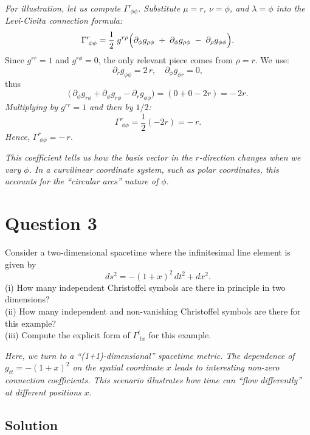     \emph{For illustration, let us compute \(\Gamma^r_{\;\phi\phi}\). Substitute \(\mu = r\), \(\nu = \phi\), and \(\lambda = \phi\) into the Levi-Civita connection formula:}
    \[
        \Gamma^r_{\;\phi\phi}
        =
        \frac{1}{2}
        \;g^{r\rho}
        \Bigl(
        \partial_\phi g_{\rho\phi}
        \;+\;
        \partial_\phi g_{\rho\phi}
        \;-\;
        \partial_\rho g_{\phi\phi}
        \Bigr).
    \]
    Since \(g^{rr} = 1\) and \(g^{r\phi} = 0\), the only relevant piece comes from \(\rho = r\). We use:
    \[
        \partial_r g_{\phi\phi} = 2\,r,
        \quad
        \partial_\phi g_{\phi r} = 0,
    \]
    thus
    \[
        \bigl(\,\partial_\phi g_{r\phi} + \partial_\phi g_{r\phi} - \partial_r g_{\phi\phi}\bigr)
        =
        (0 + 0 - 2r)
        =
        -\,2r.
    \]
    \emph{Multiplying by \(g^{rr} = 1\) and then by \(1/2\):}
    \[
        \Gamma^r_{\;\phi\phi}
        =
        \frac12 (-2r)
        =
        -\,r.
    \]
    \emph{Hence,}
    \(\boxed{\Gamma^r_{\;\phi\phi} = -\,r}.\)

    \emph{This coefficient tells us how the basis vector in the \(r\)-direction changes when we vary \(\phi\). In a curvilinear coordinate system, such as polar coordinates, this accounts for the “circular arcs” nature of \(\phi\).}

    \pagebreak

    \section*{Question 3}

    Consider a two-dimensional spacetime where the infinitesimal line element is given by
    \[
        ds^2 = -(1+x)^2 \, dt^2 + dx^2.
    \]
    (i) How many independent Christoffel symbols are there in principle in two dimensions?\\
    (ii) How many independent and non-vanishing Christoffel symbols are there for this example?\\
    (iii) Compute the explicit form of \(\Gamma^{t}_{\;tx}\) for this example.

    \emph{Here, we turn to a “(1+1)-dimensional” spacetime metric. The dependence of \(g_{tt} = -(1+x)^2\) on the spatial coordinate \(x\) leads to interesting non-zero connection coefficients. This scenario illustrates how time can “flow differently” at different positions \(x\).}

    \subsection*{Solution}

